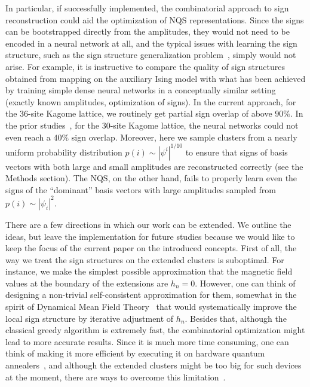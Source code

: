 In particular, if successfully implemented, the combinatorial approach to sign reconstruction could aid the optimization of NQS representations.  Since the signs can be bootstrapped directly from the amplitudes, they would not need to be encoded in a neural network at all, and the typical issues with learning the sign structure, such as the sign structure generalization problem~\cite{sign_generalization}, simply would not arise. For example, it is instructive to compare the quality of sign structures obtained from mapping on the auxiliary Ising model with what has been achieved by training simple dense neural networks in a conceptually similar setting~\cite{sign_generalization} (exactly known amplitudes, optimization of signs). In the current approach, for the 36-site Kagome lattice, we routinely get partial sign overlap of above $90\%$. In the prior studies~\cite{sign_generalization}, for the 30-site Kagome lattice, the neural networks could not even reach a $40\%$ sign overlap. Moreover, here we sample clusters from a nearly uniform probability distribution $p(i) \sim |\psi^i|^{1/10}$ to ensure that signs of basis vectors with both large and small amplitudes are reconstructed correctly (see the Methods section). The NQS, on the other hand, fails to properly learn even the signs of the ``dominant'' basis vectors with large amplitudes sampled from $p(i) \sim |\psi_i|^2$.

There are a few directions in which our work can be extended. We outline the ideas, but leave the implementation for future studies because we would like to keep the focus of the current paper on the introduced concepts. First of all, the way we treat the sign structures on the extended clusters is suboptimal. For instance, we make the simplest possible approximation that the magnetic field values at the boundary of the extensions are $h_n=0$. However, one can think of designing a non-trivial self-consistent approximation for them, somewhat in the spirit of Dynamical Mean Field Theory~\cite{DMFT} that would systematically improve the local sign structure by iterative adjustment of $h_n$. Besides that, although the classical greedy algorithm is extremely fast, the combinatorial optimization might lead to more accurate results. Since it is much more time consuming, one can think of making it more efficient by executing it on hardware quantum annealers~\cite{QA}, and although the extended clusters might be too big for such devices at the moment, there are ways to overcome this limitation~\cite{raymond2022hybrid,okada2019improving}.

